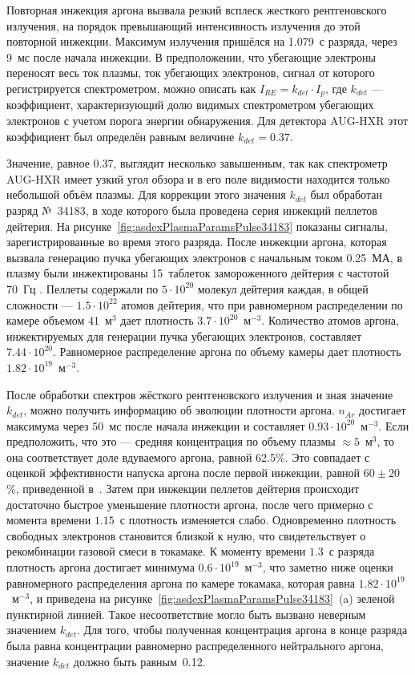 Повторная инжекция аргона вызвала резкий всплеск жесткого рентгеновского излучения, на порядок превышающий интенсивность излучения до этой повторной инжекции. Максимум излучения пришёлся на 1.079~с разряда, через 9~мс после начала инжекции. В предположении, что убегающие электроны переносят весь ток плазмы, ток убегающих электронов, сигнал от которого регистрируется спектрометром, можно описать как $I_{RE} = k_{det} \cdot I_p$, где $k_{det}$ --- коэффициент, характеризующий долю видимых спектрометром убегающих электронов с учетом порога энергии обнаружения. Для детектора AUG-HXR этот коэффициент был определён равным величине $k_{det} = 0.37$.

Значение, равное 0.37, выглядит несколько завышенным, так как спектрометр AUG-HXR имеет узкий угол обзора и в его поле видимости находится только небольшой объём плазмы. Для коррекции этого значения $k_{det}$ был обработан разряд №~34183, в ходе которого была проведена серия инжекций пеллетов дейтерия. На рисунке~\ref{fig:asdexPlasmaParamsPulse34183} показаны сигналы, зарегистрированные во время этого разряда. После инжекции аргона, которая вызвала генерацию пучка убегающих электронов с начальным током 0.25~МА, в плазму были инжектированы 15~таблеток замороженного дейтерия с частотой 70~Гц \cite{Pautasso2020}. Пеллеты содержали по $5 \cdot 10^{20}$ молекул дейтерия каждая, в общей сложности --- $1.5 \cdot 10^{22}$ атомов дейтерия, что при равномерном распределении по камере объемом 41~м${}^3$ дает плотность $3.7 \cdot 10^{20}$~м${}^{-3}$. Количество атомов аргона, инжектируемых для генерации пучка убегающих электронов, составляет $7.44 \cdot 10^{20}$. Равномерное распределение аргона по объему камеры дает плотность $1.82 \cdot 10^{19}$~м${}^{-3}$.~\cite{Shevelev2021} 

После обработки спектров жёсткого рентгеновского излучения и зная значение $k_{det}$, можно получить информацию об эволюции плотности аргона. $n_{Ar}$ достигает максимума через 50~мс после начала инжекции и составляет $0.93 \cdot 10^{20}$~м${}^{-3}$. Если предположить, что это --- средняя концентрация по объему плазмы $\approx 5$~м${}^3$, то она соответствует доле вдуваемого аргона, равной 62.5\%. Это совпадает с оценкой эффективности напуска аргона после первой инжекции, равной $60 \pm 20$\%, приведенной в~\cite{Pautasso2020}. Затем при инжекции пеллетов дейтерия происходит достаточно быстрое уменьшение плотности аргона, после чего примерно с момента времени $1.15$~с плотность изменяется слабо. Одновременно плотность свободных электронов становится близкой к нулю, что свидетельствует о рекомбинации газовой смеси в токамаке. К моменту времени $1.3$~с разряда плотность аргона достигает минимума $0.6 \cdot 10^{19}$~м${}^{-3}$, что заметно ниже оценки равномерного распределения аргона по камере токамака, которая равна $1.82 \cdot 10^{19}$~м${}^{-3}$, и приведена на рисунке~\ref{fig:asdexPlasmaParamsPulse34183}~(a) зеленой пунктирной линией. Такое несоответствие могло быть вызвано неверным значением $k_{det}$. Для того, чтобы полученная концентрация аргона в конце разряда была равна концентрации равномерно распределенного нейтрального аргона, значение $k_{det}$ должно быть равным~0.12.~\cite{Shevelev2021}

